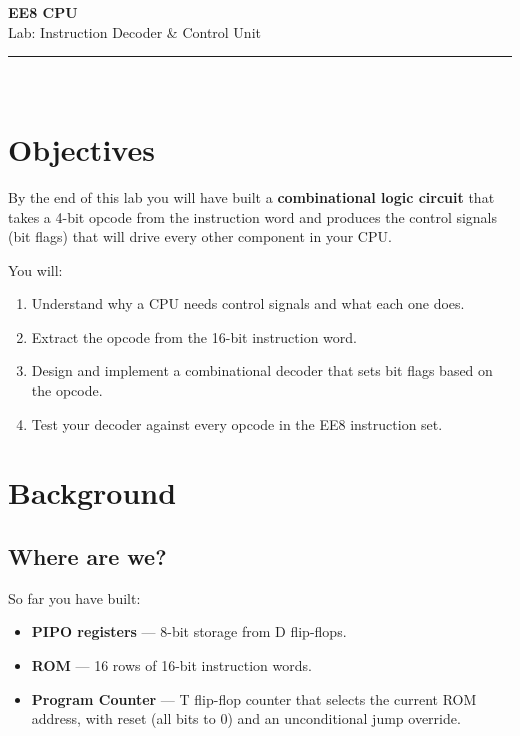 \documentclass[11pt,a4paper]{article}
\begin{document}
\begin{center}
{\Huge\bfseries\color{ee8blue} EE8 CPU}\\[0.4cm]
{\LARGE Lab: Instruction Decoder \& Control Unit}\\[0.8cm]
\rule{0.6\textwidth}{1pt}\\[0.5cm]
\end{center}

\section{Objectives}

By the end of this lab you will have built a \textbf{combinational logic circuit} that takes a 4-bit opcode from the instruction word and produces the control signals (bit flags) that will drive every other component in your CPU.

\medskip
\noindent You will:
\begin{enumerate}[leftmargin=2em]
  \item Understand why a CPU needs control signals and what each one does.
  \item Extract the opcode from the 16-bit instruction word.
  \item Design and implement a combinational decoder that sets bit flags based on the opcode.
  \item Test your decoder against every opcode in the EE8 instruction set.
\end{enumerate}

\section{Background}

\subsection{Where are we?}

So far you have built:
\begin{itemize}[leftmargin=2em]
  \item \textbf{PIPO registers} --- 8-bit storage from D flip-flops.
  \item \textbf{ROM} --- 16 rows of 16-bit instruction words.
  \item \textbf{Program Counter} --- T flip-flop counter that selects the current ROM address, with reset (all bits to 0) and an unconditional jump override.
\end{itemize}
\end{document}
